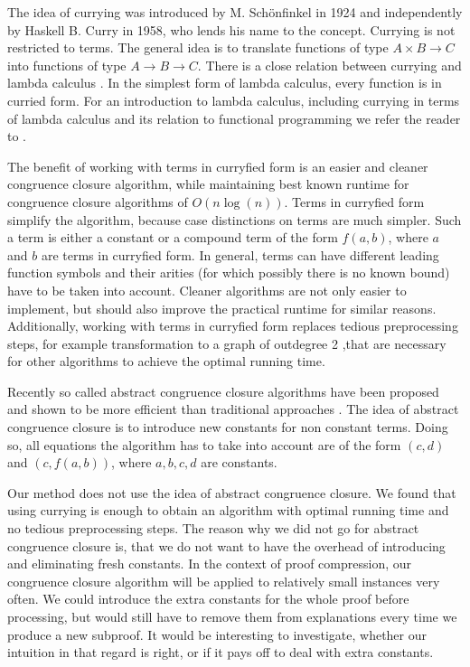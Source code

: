 The idea of currying was introduced by M. Sch\"onfinkel \cite{Schoenfinkel1924} in 1924 and independently by Haskell B. Curry \cite{Curry1958} in 1958, who lends his name to the concept.
Currying is not restricted to terms.
The general idea is to translate functions of type $A \times B \rightarrow C$ into functions of type $A \rightarrow B \rightarrow C$.
There is a close relation between currying and lambda calculus \cite{Church1936}.
In the simplest form of lambda calculus, every function is in curried form.
For an introduction to lambda calculus, including currying in terms of lambda calculus and its relation to functional programming we refer the reader to \cite{Barendregt1997}.

The benefit of working with terms in curryfied form is an easier and cleaner congruence closure algorithm, while maintaining best known runtime for congruence closure algorithms of $O(n \log(n))$.
Terms in curryfied form simplify the algorithm, because case distinctions on terms are much simpler.
Such a term is either a constant or a compound term of the form $f(a,b)$, where $a$ and $b$ are terms in curryfied form.
In general, terms can have different leading function symbols and their arities (for which possibly there is no known bound) have to be taken into account.
Cleaner algorithms are not only easier to implement, but should also improve the practical runtime for similar reasons.
Additionally, working with terms in curryfied form replaces tedious preprocessing steps, for example transformation to a graph of outdegree 2 \cite{Downey1980},that are necessary for other algorithms to achieve the optimal running time.

Recently so called abstract congruence closure algorithms have been proposed and shown to be more efficient than traditional approaches \cite{Bachmair2000}.
The idea of abstract congruence closure is to introduce new constants for non constant terms.
Doing so, all equations the algorithm has to take into account are of the form $(c,d)$ and $(c, f(a,b))$, where $a,b,c,d$ are constants.

Our method does not use the idea of abstract congruence closure.
We found that using currying is enough to obtain an algorithm with optimal running time and no tedious preprocessing steps.
The reason why we did not go for abstract congruence closure is, that we do not want to have the overhead of introducing and eliminating fresh constants.
In the context of proof compression, our congruence closure algorithm will be applied to relatively small instances very often.
We could introduce the extra constants for the whole proof before processing, but would still have to remove them from explanations every time we produce a new subproof.
It would be interesting to investigate, whether our intuition in that regard is right, or if it pays off to deal with extra constants.

